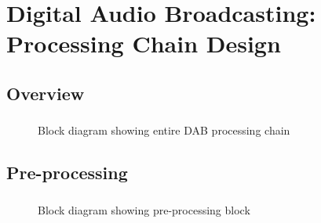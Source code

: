 \documentclass[class=beamer,10pt,crop=false]{standalone}
\begin{document}
 

\section{Digital Audio Broadcasting: Processing Chain Design}

\subsection{Overview}
\begin{frame}
    \label{slide:dab-proc_overview}
    \frametitle{\subsecname}
    
    \begin{figure}[htbp]
        \centering
        \captionsetup{type=figure}
        \def\svgwidth{\linewidth}
        {\linespread{0.8}
        \tiny
        }
        \caption{Block diagram showing entire DAB processing chain}
        \label{fig:BD_Overview_All}
    \end{figure}
    
\end{frame}


\subsection{Pre-processing}
\begin{frame}
    \label{slide:dab-proc_preprocess}
    \frametitle{\subsecname}
    
    \begin{figure}[htbp]
        \centering
        \captionsetup{type=figure}
        \def\svgwidth{\linewidth}
        {\linespread{0.8}
            \scriptsize
            }
        \caption{Block diagram showing pre-processing block}
        \label{fig:BD_Preprocess_All}
      \end{figure}
      
\end{frame}

    
      
\end{document}
